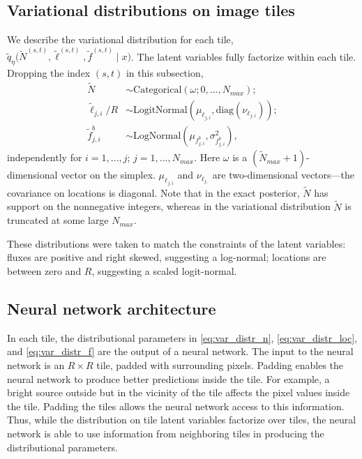 \subsection{Variational distributions on image tiles}
\label{sec:distr_on_tiles}
We describe the variational distribution for each tile,
$\tilde q_\eta\big(\tilde N^{(s, t)}, \tilde \ell^{(s, t)}, \tilde f^{(s, t)} \mid x\big)$.
The latent variables fully factorize within each tile.
Dropping the index
$(s,t)$ in this subsection,
\begin{align}
    \tilde N &\sim \text{Categorical}(
    \omega; 0, ..., N_{max});  \label{eq:var_distr_n}\\
	\tilde \ell_{j, i} / R &\sim \text{LogitNormal}(\mu_{\ell_{j, i}}, \text{diag}(\nu_{\ell_{j, i}}) )\label{eq:var_distr_loc}; \\
	\tilde f^b_{j, i} &\sim \text{LogNormal}(\mu_{f^b_{j, i}}, \sigma^2_{f^b_{j, i}}), \label{eq:var_distr_f}
\end{align}
independently for $i = 1, ..., j$; $j = 1, ..., N_{max}$.
Here $\omega$ is a $(\tilde N_{max} + 1)$-dimensional vector on the simplex. $\mu_{\ell_{j, i}}$ and $\nu_{\ell_{j, }}$ are two-dimensional vectors---the covariance on locations is diagonal.
Note that in the exact posterior, $\tilde N$ has support on the nonnegative integers, whereas in the variational distribution $\tilde N$ is truncated at some large $N_{max}$.


These distributions were taken to match the constraints of the latent variables: fluxes are positive and right skewed, suggesting a log-normal; locations are between zero and $R$, suggesting a scaled logit-normal.

\subsection{Neural network architecture}
\label{sec:nn_architecture}

In each tile, the distributional parameters in \eqref{eq:var_distr_n},
\eqref{eq:var_distr_loc}, and \eqref{eq:var_distr_f} are the output of a neural network.
The input to the neural network is an $R \times R$ tile, padded with surrounding pixels.
Padding enables the neural network to produce better predictions inside the tile.
For example, a bright source outside but in the vicinity of the tile affects the pixel values inside the tile.
Padding the tiles allows the neural network access to this information.
Thus, while the distribution on tile latent variables factorize over tiles, the neural network is able to use information from neighboring tiles in producing the distributional parameters.

